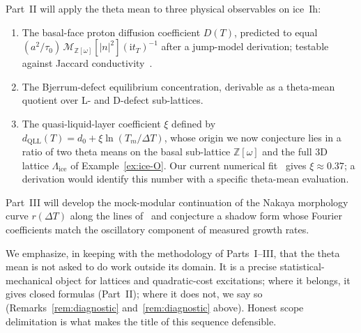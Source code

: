 \documentclass[11pt,letterpaper]{article}
\theoremstyle{plain}
\theoremstyle{definition}
\newcommand{\Eisenstein}{\mathbb{Z}[\omega]}
\newcommand{\Lat}{\Lambda}
\newcommand{\tmeaneis}[1]{\mathcal{M}_{\Eisenstein}[#1]}
\begin{document}
Part~II will apply the theta mean to three physical observables on
ice~Ih:
\begin{enumerate}[leftmargin=2em]
\item The basal-face proton diffusion coefficient $D(T)$, predicted
  to equal $(a^2/\tau_0)\,\tmeaneis{|n|^2}(\mathrm{i} t_T)^{-1}$
  after a jump-model derivation; testable against Jaccard
  conductivity~\cite{PetrenkoWhitworth}.
\item The Bjerrum-defect equilibrium concentration, derivable as a
  theta-mean quotient over L- and D-defect sub-lattices.
\item The quasi-liquid-layer coefficient $\xi$ defined by
  $d_{\text{QLL}}(T)=d_0+\xi\ln(T_m/\Delta T)$, whose origin we now
  conjecture lies in a ratio of two theta means on the basal
  sub-lattice $\Eisenstein$ and the full 3D lattice
  $\Lat_{\text{ice}}$ of Example~\ref{ex:ice-O}.  Our current
  numerical fit~\cite{MamounPaperIII} gives $\xi\approx 0.37$;
  a derivation would identify this number with a specific
  theta-mean evaluation.
\end{enumerate}

Part~III will develop the mock-modular continuation of the Nakaya
morphology curve $r(\Delta T)$ along the lines of~\cite{Zwegers2002}
and conjecture a shadow form whose Fourier coefficients match the
oscillatory component of measured growth rates.

We emphasize, in keeping with the methodology of Parts~I--III,
that the theta mean is not asked to do work outside its domain.  It
is a precise statistical-mechanical object for lattices and
quadratic-cost excitations; where it belongs, it gives closed
formulas (Part~II); where it does not, we say so
(Remarks~\ref{rem:diagnostic} and~\ref{rem:diagnostic} above).
Honest scope delimitation is what makes the title of this sequence
defensible.
\end{document}
